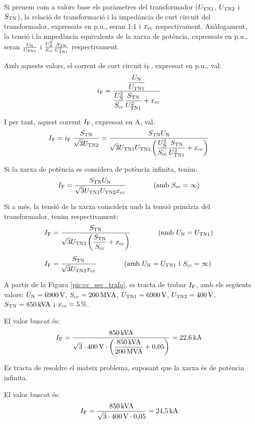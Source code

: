  Si prenem com a valors base els
par\`{a}metres del transformador ($U_\mathrm{TN1}$, $U_\mathrm{TN2}$ i
$S_\mathrm{TN}$), la relaci\'{o} de transformaci\'{o} i la imped\`{a}ncia de curt
circuit del transformador, expressats en p.u., seran 1:1 i
$x_\mathrm{cc}$ respectivament. An\`{a}logament, la tensi\'{o} i la imped\`{a}ncia
equivalents de la xarxa de pot\`{e}ncia, expressats en p.u., seran
$\frac{U_\mathrm{N}}{U_\mathrm{TN1}}$ i $\frac{U_\mathrm{N}^2}{S_\mathrm{cc}}
\frac{S_\mathrm{TN}}{U_\mathrm{TN1}^2}$ respectivament.

Amb aquests valors, el corrent de curt circuit $i_\mathrm{F}$, expressat
en p.u., val:
\begin{equation}
    i_\mathrm{F} = \frac{\dfrac{U_\mathrm{N}}{U_\mathrm{TN1}}}{\dfrac{U_\mathrm{N}^2}{S_\mathrm{cc}}
    \dfrac{S_\mathrm{TN}}{U_\mathrm{TN1}^2} + x_\mathrm{cc}}
\end{equation}

I per tant, aquest corrent $I_\mathrm{F}$, expressat en A, val:
\begin{equation}
    I_\mathrm{F} = i_\mathrm{F}\; \frac{S_\mathrm{TN}}{\sqrt{3}U_\mathrm{TN2}} =
    \frac{S_\mathrm{TN} U_\mathrm{N}}{\sqrt{3} U_\mathrm{TN1}U_\mathrm{TN2}
    \left(\dfrac{U_\mathrm{N}^2}{S_\mathrm{cc}}
    \dfrac{S_\mathrm{TN}}{U_\mathrm{TN1}^2} + x_\mathrm{cc}\right)}
\end{equation}

Si la xarxa de pot\`{e}ncia es considera de pot\`{e}ncia infinita, tenim:
\begin{equation}
    I_\mathrm{F} = \frac{S_\mathrm{TN} U_\mathrm{N}}{\sqrt{3} U_\mathrm{TN1}U_\mathrm{TN2}
    x_\mathrm{cc}}\qquad\qquad (\text{amb }S_\mathrm{cc}=\infty)
\end{equation}

Si a m\'{e}s, la tensi\'{o} de la xarxa coincideix amb la tensi\'{o} prim\`{a}ria
del transformador, tenim respectivament:
\begin{align}
    I_\mathrm{F} &= \frac{S_\mathrm{TN}}{\sqrt{3} U_\mathrm{TN2}
    \left(\dfrac{S_\mathrm{TN}}{S_\mathrm{cc}} +
    x_\mathrm{cc}\right)}\qquad\qquad(\text{amb }U_\mathrm{N}=U_\mathrm{TN1})\\[1ex]
    I_\mathrm{F} &= \frac{S_\mathrm{TN}}{\sqrt{3} U_\mathrm{TN2}
    x_\mathrm{cc}}\qquad\qquad(\text{amb }U_\mathrm{N}=U_\mathrm{TN1}\text{ i }
    S_\mathrm{cc}=\infty)
\end{align}

\begin{exemple}
A partir de la Figura \vref{pic:cc_sec_trafo}, es tracta de trobar
$I_\mathrm{F}$, amb els seg\"{u}ents valors: $U_\mathrm{N}=6900\mathrm{\,V}$,
$S_\mathrm{cc}=200\mathrm{\,MVA}$, $U_\mathrm{TN1}=6900\mathrm{\,V}$,
$U_\mathrm{TN2}=400\mathrm{\,V}$, $S_\mathrm{TN}=850\mathrm{\,kVA}$ i
$x_\mathrm{cc}=5\mathrm{\,\%}$.

El valor buscat \'{e}s:
\begin{align}
    I_\mathrm{F} = \frac{850\mathrm{\,kVA}}{\sqrt{3}\cdot 400\mathrm{\,V}\cdot
    \left(\dfrac{850\mathrm{\,kVA}}{200\mathrm{\,MVA}} +
    0{,}05\right)} = 22{,}6\mathrm{\,kA}
\end{align}
\end{exemple}

\begin{exemple}
Es tracta de resoldre el mateix problema, suposant que la xarxa \'{e}s
de pot\`{e}ncia infinita.

El valor buscat \'{e}s:
\begin{align}
    I_\mathrm{F} = \frac{850\mathrm{\,kVA}}{\sqrt{3}\cdot 400\mathrm{\,V}\cdot
    0{,}05} = 24{,}5\mathrm{\,kA}
\end{align}
\end{exemple}

